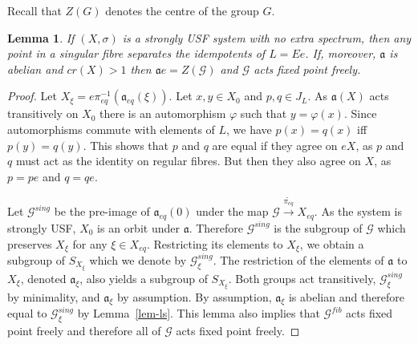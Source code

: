 \documentclass[10pt,a4paper]{amsart}
\newtheorem{lemma}[theorem]{Lemma}
\numberwithin{equation}{section}
\newcommand{\Gg}{{\mathcal G}}
\newcommand{\Xe}{X_{eq}}
\newcommand{\aut}{{\mathfrak a}}
\newcommand{\aute}{\aut_{eq}}
\newcommand{\pe}{\pi_{eq}}
\newcommand{\tpe}{\widetilde{\pe}}
\begin{document}
Recall that $Z(G)$ denotes the centre of the group $G$.
\begin{lemma} \label{lem-trans} If $(X,\sigma)$ is a  strongly USF  system with no extra spectrum,
then any point in a  singular fibre separates the idempotents of $L=Ee$. 
If, moreover, $\aut$ is abelian 
and $cr(X)>1$ 
then $\aut e = Z(\Gg)$ and $\Gg$ acts fixed point freely. 
\end{lemma}
\begin{proof}
Let $X_\xi=  e\pe^{-1}( \aute (\xi))$. 
Let $x,y\in X_0$ and $p,q\in J_L$. As $\aut(X)$ acts transitively on $X_0$ there is an automorphism $\varphi$ such that $y=\varphi(x)$. Since automorphisms commute with elements of $L$, we have $p(x)=q(x)$ iff $p(y)=q(y)$. This shows that $p$ and $q$ are equal if they agree on $eX$, as  $p$ and $q$ must act as the identity on regular fibres. But then they also agree on $X$, as $p = pe$ and $q=qe$.

Let $\Gg^{sing}$ be the pre-image of $\aute(0)$ under the map 
$\Gg\stackrel{\tpe}\to \Xe$.   
As the system is strongly USF,  ${X_0}$ is an orbit under $\aut$. Therefore $\Gg^{sing}$ is the subgroup of $\Gg$ which preserves 
$X_\xi$ for any $\xi\in \Xe$. 
Restricting its elements to $X_\xi$, we obtain a subgroup of $S_{X_\xi}$ which we denote by $\Gg^{sing}_\xi$. The restriction of the elements of $\aut$ to $X_\xi$, denoted $\aut_\xi$,  also yields  a subgroup of 
$S_{X_\xi}$. Both groups act transitively, $\Gg^{sing}_\xi$ by minimality, and $\aut_\xi$ by assumption. By assumption, $\aut_\xi$ is abelian and therefore equal to $\Gg^{sing}_\xi$ by Lemma~\ref{lem-ls}. This lemma also implies that $\Gg^{fib}$ acts fixed point freely and therefore all of $\Gg$ acts fixed point freely.



\end{proof}
\end{document}
